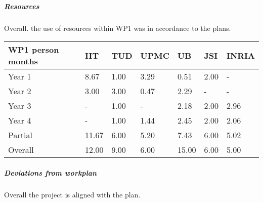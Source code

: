 

\subparagraph*{Resources}
Overall. the use of resources within WP1 was in accordance to the plans. 

\begin{center}
  \begin{tabular}{|C{1.5cm}|C{1.5cm}|C{1.5cm}|C{2cm}|C{2cm}|C{2cm}|C{2cm}|}
    \hline \footnotesize \textbf{WP1 person months}& \footnotesize
    \textbf{IIT}&\footnotesize \textbf{TUD}&\footnotesize \textbf{UPMC}&
    \footnotesize \textbf{UB} &\footnotesize \textbf{JSI} & \footnotesize \textbf{INRIA}\\
    \hline \footnotesize Year 1  & 8.67  & 1.00 & 3.29 & 0.51 & 2.00 & -\\
    \hline \footnotesize Year 2  & 3.00  & 3.00 & 0.47 & 2.29 & -    & - \\
    \hline \footnotesize Year 3  & -     & 1.00 & -    & 2.18 & 2.00 & 2.96 \\
    \hline \footnotesize Year 4  & -     &  1.00 &  1.44 &  2.45  &  2.00  &  2.06 \\ \hline 
    \footnotesize Partial & 11.67 &  6.00 &  5.20 &  7.43 &  6.00 &  5.02    \\  \hline
    \hline \footnotesize Overall & 12.00 & 9.00 & 6.00 & 15.00 & 6.00 & 5.00 \\
    \hline
  \end{tabular}
\end{center}

\subparagraph*{Deviations from workplan} 
Overall the project is aligned with the plan.
